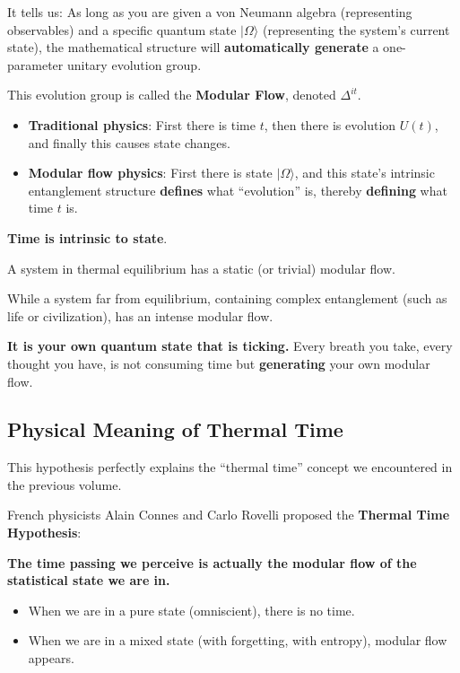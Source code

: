 It tells us: As long as you are given a von Neumann algebra (representing observables) and a specific quantum state $|\Omega\rangle$ (representing the system's current state), the mathematical structure will \textbf{automatically generate} a one-parameter unitary evolution group.

This evolution group is called the \textbf{Modular Flow}, denoted $\Delta^{it}$.

\begin{itemize}
\item \textbf{Traditional physics}: First there is time $t$, then there is evolution $U(t)$, and finally this causes state changes.

\item \textbf{Modular flow physics}: First there is state $|\Omega\rangle$, and this state's intrinsic entanglement structure \textbf{defines} what ``evolution'' is, thereby \textbf{defining} what time $t$ is.
\end{itemize}

\textbf{Time is intrinsic to state}.

A system in thermal equilibrium has a static (or trivial) modular flow.

While a system far from equilibrium, containing complex entanglement (such as life or civilization), has an intense modular flow.

\textbf{It is your own quantum state that is ticking.} Every breath you take, every thought you have, is not consuming time but \textbf{generating} your own modular flow.

\subsection{Physical Meaning of Thermal Time}

This hypothesis perfectly explains the ``thermal time'' concept we encountered in the previous volume.

French physicists Alain Connes and Carlo Rovelli proposed the \textbf{Thermal Time Hypothesis}:

\textbf{The time passing we perceive is actually the modular flow of the statistical state we are in.}

\begin{itemize}
\item When we are in a pure state (omniscient), there is no time.

\item When we are in a mixed state (with forgetting, with entropy), modular flow appears.
\end{itemize}

